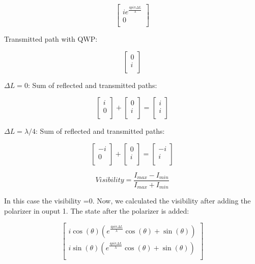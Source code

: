 \documentclass{article}
\begin{document}
\[\begin{bmatrix}
ie^{\frac{4pi\pi\Delta{L}}{\lambda}}\\
0\\
\end{bmatrix}
\]
\begin{flushleft}
Transmitted path with QWP:
\end{flushleft}
\[\begin{bmatrix}
0\\
i\\
\end{bmatrix}
\]
\begin{flushleft}
$\Delta{L} = 0$: Sum of reflected and transmitted paths:
\end{flushleft}
\[\begin{bmatrix}
i\\
0\\
\end{bmatrix}
+
\begin{bmatrix}
0\\
i\\
\end{bmatrix}
=
\begin{bmatrix}
i\\
i\\
\end{bmatrix}
\]
\begin{flushleft}
$\Delta{L} = \lambda/4$: Sum of reflected and transmitted paths:
\end{flushleft}
\[\begin{bmatrix}
-i\\
0\\
\end{bmatrix}
+
\begin{bmatrix}
0\\
i\\
\end{bmatrix}
=
\begin{bmatrix}
-i\\
i\\
\end{bmatrix}
\]

\begin{equation*}
  Visibility = \frac{I_{max}-I_{min}}{I_{max}+I_{min}}  
\end{equation*}

\begin{flushleft}
In this case the visibility =0. Now, we calculated the visibility after adding the polarizer in ouput 1. The state after the polarizer is added:
\end{flushleft}
\[\begin{bmatrix}
i\cos(\theta)(e^{\frac{4pi\pi\Delta{L}}{\lambda}}\cos(\theta)+\sin(\theta))\\
i\sin(\theta)(e^{\frac{4pi\pi\Delta{L}}{\lambda}}\cos(\theta)+\sin(\theta))\\
\end{bmatrix}
\]
\end{document}
